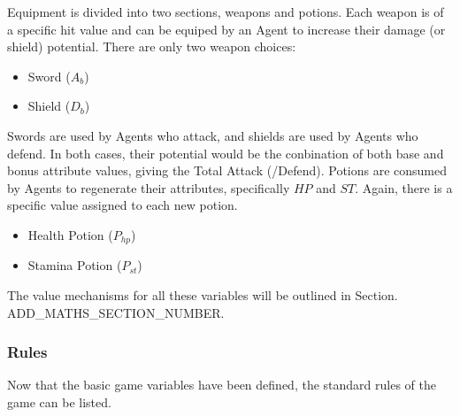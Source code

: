 Equipment is divided into two sections, weapons and potions. Each weapon is of a specific hit value and can be equiped by an Agent to increase their damage (or shield) potential. There are only two weapon choices:

\begin{itemize}
    \item Sword ($A_b$)
    \item Shield ($D_b$)
\end{itemize}

Swords are used by Agents who attack, and shields are used by Agents who defend. In both cases, their potential would be the conbination of both base and bonus attribute values, giving the Total Attack (/Defend). Potions are consumed by Agents to regenerate their attributes, specifically $HP$ and $ST$. Again, there is a specific value assigned to each new potion. 

\begin{itemize}
    \item Health Potion ($P_{hp}$)
    \item Stamina Potion ($P_{st}$)
\end{itemize}

The value mechanisms for all these variables will be outlined in Section. ADD\_MATHS\_SECTION\_NUMBER. 

\subsubsection{Rules}
Now that the basic game variables have been defined, the standard rules of the game can be listed. 

